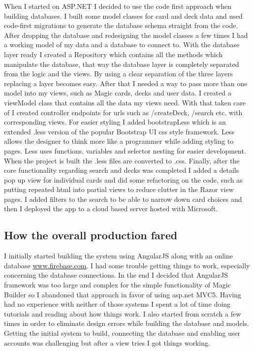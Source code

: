 \documentclass[paper=a4, fontsize=11pt]{scrartcl} %
\numberwithin{equation}{section} %
\numberwithin{figure}{section} %
\numberwithin{table}{section} %
\begin{document}
When I started on ASP.NET I decided to use the code first approach when building databases. I built some model classes for card and deck data and used code-first migrations to generate the database schema straight from the code. After dropping the database and redesigning the model classes a few times I had a working model of my data and a database to connect to. With the database layer ready I created a Repository which contains all the methods which manipulate the database, that way the database layer is completely separated from the logic and the views. By using a clear separation of the three layers replacing a layer becomes easy. After that I needed a way to pass more than one model into my views, such as Magic cards, decks and user data. I created a viewModel class that contains all the data my views need. With that taken care of I created controller endpoints for urls such as /createDeck, /search etc. with corresponding views. For easier styling I added bootstrapLess which is an extended .less version of the popular Bootstrap UI css style framework.  Less allows the designer to think more like a programmer while adding styling to pages. Less uses functions, variables and selector nesting for easier development. When the project is built the .less files are converted to .css. Finally, after the core functionality regarding search and decks was completed I added a details pop up view for individual cards and did some refactoring on the code, such as putting repeated html into partial views to reduce clutter in the Razor view pages. I added filters to the search to be able to narrow down card choices and then I deployed the app to a cloud based server hosted with Microsoft.
\subsection{How the overall production fared}
I initially started building the system using AngularJS along with an online database \href{http://www.firebase.com}{www.firebase.com}. I had some trouble getting things to work, especially concerning the database connections. In the end I decided that AngularJS framework was too large and complex for the simple functionality of Magic Builder so I abandoned that approach in favor of using asp.net MVC5. Having had no experience with neither of those systems I spent a lot of time doing tutorials and reading about how things work. I also started from scratch a few times in order to eliminate design errors while building the database and models. Getting the initial system to build, connecting the database and enabling user accounts was challenging but after a view tries I got things working. 
\end{document}

